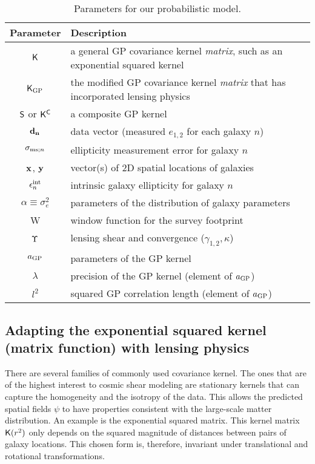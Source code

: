 \begin{table}%
\begin{center}
\caption{Parameters for our probabilistic model.}
\label{tab:sampling_parameters}
\begin{tabular}{cl}
\hline
Parameter & Description \\
\hline
$\mathsf{K}$ & a general GP covariance kernel {\it matrix}, such as an exponential squared kernel \\
$\mathsf{K}_{\rm GP}$  & the modified GP covariance kernel {\it matrix} that has incorporated
lensing physics\\
$\mathsf{S}$ or $\mathsf{K}^{\mathsf{C}}$ & a composite GP kernel \\
${\bf d_{n}}$ & data vector (measured $e_{1,2}$ for each galaxy $n$)  \\
$\sigma_{{\rm ms}; n}$ & ellipticity measurement error for galaxy $n$ 
\\
$\mathbf{x}$, $\mathbf{y}$ & vector(s) of 2D spatial locations of galaxies \\
$\epsilon_n^{\rm int}$ & intrinsic galaxy ellipticity for galaxy $n$ \\
$\alpha\equiv\sigma_{e}^2$ & parameters of the distribution of galaxy parameters \\
W & window function for the survey footprint \\
$\Upsilon$ & lensing shear and convergence ($\gamma_{1,2}, \kappa$) \\
$a_{\rm GP}$ & parameters of the GP kernel\\
$\lambda$ & precision of the GP kernel (element of $a_{\rm GP}$) \\
$l^2$ & squared GP correlation length (element of $a_{\rm GP}$) \\
\hline
\end{tabular}
\end{center}
\end{table}
\subsection{Adapting the exponential squared kernel (matrix function) with lensing physics}
There are several families of commonly used covariance kernel.
The ones that are of the highest interest to cosmic shear modeling 
are stationary kernels that can capture 
the homogeneity and the isotropy of the data. This allows the predicted spatial fields
$\psi$ to have properties consistent with the large-scale matter distribution.
An example is the exponential squared matrix.
This kernel matrix $\mathsf{K}(r^2)$ only depends on the
squared magnitude of distances between pairs of galaxy locations. 
This chosen form is, therefore, invariant
under translational and rotational transformations.

